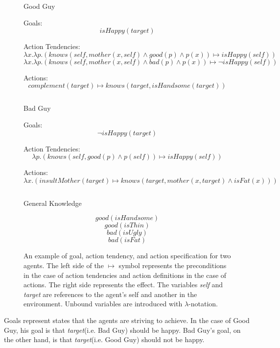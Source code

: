 \documentclass{article}
\begin{document}
\begin{figure}[h!]
  
  \begin{center}
    \large{Good Guy}
  \end{center}
  
  Goals:
  \[
  isHappy(target)
  \]

  Action Tendencies:
  \[
  \lambda x.\lambda p.(knows(self, mother(x,self) \wedge good(p) \wedge p(x)) \mapsto isHappy(self))
  \]
  \[
  \lambda x.\lambda p.(knows(self, mother(x,self) \wedge bad(p) \wedge p(x)) \mapsto \neg isHappy(self))
  \]

  Actions:
  \[
  complement(target) \mapsto knows(target, isHandsome(target))
  \]

  \[\]

  \begin{center}
    \large{Bad Guy}
  \end{center}
  
  Goals:
  \[
  \neg isHappy(target)
  \]

  Action Tendencies:
  \[
  \lambda p.(knows(self, good(p) \wedge p(self)) \mapsto isHappy(self))
  \]

  Actions:
  \[
  \lambda x.(insultMother(target) \mapsto knows(target, mother(x, target) \wedge
  isFat(x))) 
  \]
  
  \[\]

  \begin{center} \large{General Knowledge} \end{center}

  \[
  good(isHandsome)
  \]
  \[
  good(isThin)
  \]
  \[
  bad(isUgly)
  \]
  \[
  bad(isFat)
  \]

  \caption{An example of goal, action tendency, and action
    specification for two agents.  The left side of the $\mapsto$ symbol
    represents the preconditions in the case of action tendencies and
    action definitions in the case of actions.  The right side
    represents the effect.  The variables \emph{self} and
    \emph{target} are references to the agent's self and another in
    the environment.  Unbound variables are introduced with $\lambda$-notation.}
  \label{example_goals}

\end{figure}

Goals represent states that the agents are striving to achieve.  In
the case of Good Guy, his goal is that \emph{target}(i.e. Bad Guy)
should be happy.  Bad Guy's goal, on the other hand, is that
\emph{target}(i.e. Good Guy) should not be happy.
\end{document}
